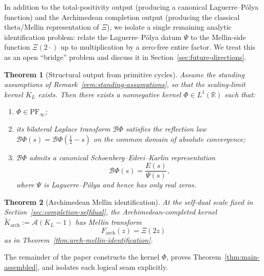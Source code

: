\documentclass[12pt]{amsart}
\newtheorem{theorem}{Theorem}[section]
\theoremstyle{definition}
\theoremstyle{remark}
\newcommand{\R}{\mathbb{R}}
\begin{document}
\medskip

\noindent
In addition to the total-positivity output (producing a canonical Laguerre--P\'olya function) and
the Archimedean completion output (producing the classical theta/Mellin representation of $\Xi$),
we isolate a single remaining analytic identification problem: relate the Laguerre--P\'olya datum
$\Psi$ to the Mellin-side function $\Xi(2\cdot)$ up to multiplication by a zero-free entire factor.
We treat this as an open ``bridge'' problem and discuss it in Section~\ref{sec:future-directions}.


\begin{theorem}[Structural output from primitive cycles]
\label{thm:structural}
Assume the standing assumptions of Remark~\ref{rem:standing-assumptions},
so that the scaling-limit kernel $K_L$ exists.
Then there exists a nonnegative kernel $\Phi\in L^1(\R)$ such that:
\begin{enumerate}[label=(\roman*)]
\item $\Phi\in\mathrm{PF}_\infty$;
\item its bilateral Laplace transform $\mathcal B\Phi$ satisfies the reflection law
$\mathcal B\Phi(s)=\mathcal B\Phi(\tfrac12-s)$ on the common domain of absolute convergence;
\item $\mathcal B\Phi$ admits a canonical Schoenberg--Edrei--Karlin representation
\[
\mathcal B\Phi(s)=\frac{E(s)}{\Psi(s)},
\]
where $\Psi$ is Laguerre--P\'olya and hence has only real zeros.
\end{enumerate}
\end{theorem}

\begin{theorem}[Archimedean Mellin identification]
\label{thm:arch-overview}
At the self-dual scale fixed in Section~\ref{sec:completion-selfdual}, the Archimedean-completed
kernel $\widetilde K_{\mathrm{arch}}:=\mathcal A(K_L-1)$ has Mellin transform
\[
F_{\mathrm{arch}}(z)=\Xi(2z)
\]
as in Theorem~\ref{thm:arch-mellin-identification}.
\end{theorem}


The remainder of the paper constructs the kernel $\Phi$, proves Theorem~\ref{thm:main-assembled}, and isolates each logical seam explicitly.

\medskip
\end{document}
